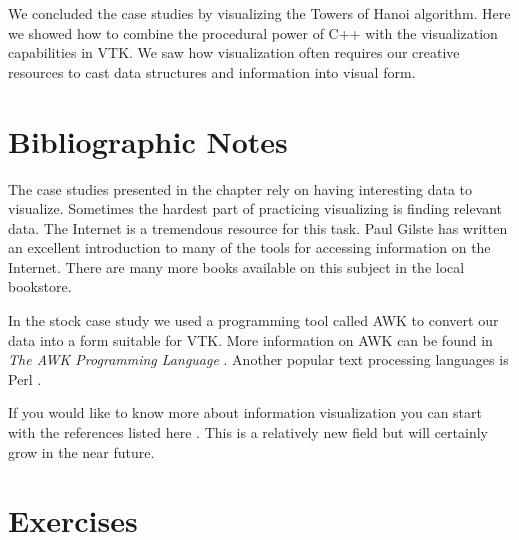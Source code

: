 We concluded the case studies by visualizing the Towers of Hanoi algorithm. Here we showed how to combine the procedural power of C++ with the visualization capabilities in VTK. We saw how visualization often requires our creative resources to cast data structures and information into visual form.


\section{Bibliographic Notes}

The case studies presented in the chapter rely on having interesting data to visualize. Sometimes the hardest part of practicing visualizing is finding relevant data. The Internet is a tremendous resource for this task. Paul Gilste \cite{Gilster94} has written an excellent introduction to many of the tools for accessing information on the Internet. There are many more books available on this subject in the local bookstore.

In the stock case study we used a programming tool called AWK to convert our data into a form suitable for VTK. More information on AWK can be found in \emph{The AWK Programming Language} \cite{Aho88}. Another popular text processing languages is Perl \cite{Perl95}.

If you would like to know more about information visualization you can start with the references listed here \cite{Becker95} \cite{Ding90} \cite{Eick93} \cite{Feiner88} \cite{Johnson91} \cite{Robertson91}. This is a relatively new field but will certainly grow in the near future.

\printbibliography

\section{Exercises}
\label{exercises:ch_12}

